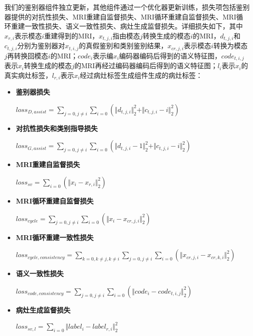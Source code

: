 \documentclass[letterpaper]{article} %
\begin{document}
我们的鉴别器组件独立更新，其他组件通过一个优化器更新训练，损失项包括鉴别器提供的对抗性损失、MRI重建自监督损失、MRI循环重建自监督损失、MRI循环重建一致性损失、语义一致性损失、病灶生成监督损失。详细损失如下，其中$x_{r,i}$表示模态$i$重建得到的MRI，$x_{t,j,i}$指由模态$j$转换生成的模态$i$的MRI，$d_{t,j,i}$和$c_{t,j,i}$分别为鉴别器对$x_{t,i,j}$的真假鉴别和类别鉴别结果，$x_{cr,j,i}$表示模态$i$转换为模态$j$再转换回模态$i$的MRI；$code_i$表示编$x_i$编码器编码后得到的语义特征图，$code_{t,i,j}$表示$x_i$转换生成的模态$j$的MRI再经过编码器编码后得到的语义特征图；$l_i$表示$x_i$的真实病灶标签，$l_{r,i}$表示$x_i$经过病灶标签生成组件生成的病灶标签：

\begin{itemize}
	\item \textbf{鉴别器损失}
	\begin{center}
		$loss_{D,assist}=\sum\limits_{j=0,j\neq i}\sum\limits_{i=0}(\Vert{d_{t,j,i}}\Vert_{2}^{2}+\Vert{c_{t,j,i}-i}\Vert_{2}^{2})$
	\end{center}
	
	\item \textbf{对抗性损失和类别指导损失}
	\begin{center}
		$loss_{G,assist}=\sum\limits_{j=0,j\neq i}\sum\limits_{i=0}(\Vert{d_{t,j,i}-1}\Vert_{2}^{2}+\Vert{c_{t,j,i}-i}\Vert_{2}^{2})$
	\end{center}
	
	\item \textbf{MRI重建自监督损失}
	\begin{center}
		$loss_{sv}=\sum\limits_{i=0}(\Vert{x_i-x_{r,i}}\Vert_{2}^{2})$
	\end{center}
	
	\item \textbf{MRI循环重建自监督损失}
	
	\begin{center}
		$loss_{cycle}=\sum\limits_{j=0,j\neq i}\sum\limits_{i=0}(\Vert{x_i-x_{cr,j,i}}\Vert_{2}^{2})$
	\end{center}
	
	\item \textbf{MRI循环重建一致性损失}
	\begin{center}
		$loss_{cycle,consistency}=\sum\limits_{k=0,k\neq j,k\neq i}\sum\limits_{j=0,j\neq i}\sum\limits_{i=0}(\Vert{x_{cr,j,i}-x_{cr,k,i}}\Vert_{2}^{2})$
	\end{center}
	
	\item \textbf{语义一致性损失}
	\begin{center}
		$loss_{code,consistency}=\sum\limits_{j=0,j\neq i}\sum\limits_{i=0}(\Vert{code_i-code_{t,i,j}}\Vert_{2}^{2})$
	\end{center}
	
	\item \textbf{病灶生成监督损失}
	\begin{center}
		$loss_{sv,l}=\sum\limits_{i=0}\Vert{label_i-label_{r,i}}\Vert_{2}^{2}$
	\end{center}
	
\end{itemize}
\end{document}
